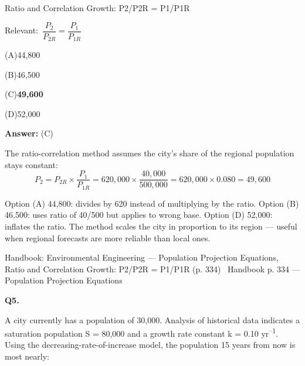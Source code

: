 \documentclass[11pt]{article}
\newcommand{\correct}[1]{\textbf{#1}\;{\color{accent}$\checkmark$}}
\newcommand{\optline}[2]{\par\noindent\hspace{1.2em}(#1)\hspace{0.6em}#2}
\begin{document}
Ratio and Correlation Growth: P2/P2R = P1/P1R\par\vspace{3pt}
{\small\color{soft}Relevant:}\ $\dfrac{P_2}{P_{2R}} = \dfrac{P_1}{P_{1R}}$\par\vspace{3pt}
\optline{A}{44,800}
\optline{B}{46,500}
\optline{C}{\correct{49,600}}
\optline{D}{52,000}
\par\vspace{3pt}
\vspace{2pt}\par\noindent\colorbox{boxbg}{\parbox{\dimexpr\linewidth-2\fboxsep\relax}{%
\vspace{2pt}\textbf{Answer:} (C)\par\vspace{2pt}
{\small The ratio-correlation method assumes the city's share of the regional population stays constant:
\[P_2 = P_{2R} \times \frac{P_1}{P_{1R}} = 620{,}000 \times \frac{40{,}000}{500{,}000} = 620{,}000 \times 0.080 = 49{,}600\]

Option (A) 44,800: divides by 620 instead of multiplying by the ratio. Option (B) 46,500: uses ratio of 40/500 but applies to wrong base. Option (D) 52,000: inflates the ratio. The method scales the city in proportion to its region --- useful when regional forecasts are more reliable than local ones.}\par\vspace{2pt}
{\footnotesize\color{soft}Handbook: Environmental Engineering --- Population Projection Equations, Ratio and Correlation Growth: P2/P2R = P1/P1R (p. 334) \textbullet\ Handbook p. 334 --- Population Projection Equations}\vspace{2pt}
}}
\vspace{9pt}
\filbreak
\textbf{\color{accent}Q5.}\par\vspace{2pt}
A city currently has a population of 30,000. Analysis of historical data indicates a saturation population S = 80,000 and a growth rate constant k = 0.10 yr\textsuperscript{--}\textsuperscript{1}. Using the decreasing-rate-of-increase model, the population 15 years from now is most nearly:
\end{document}
